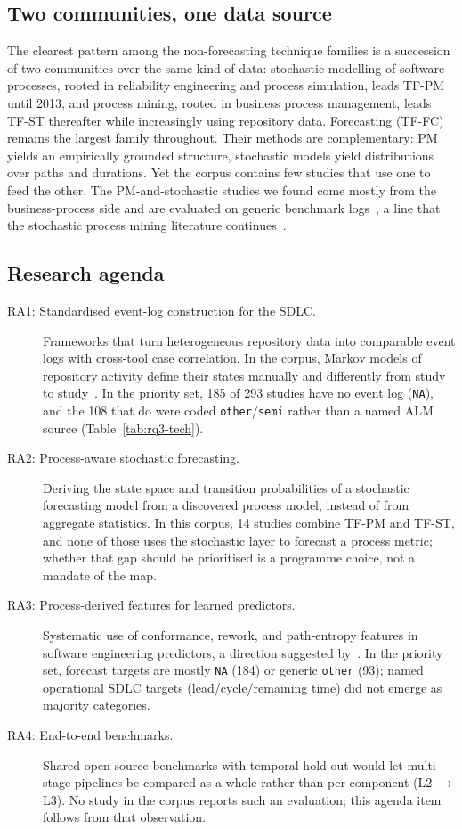\documentclass[preprint,12pt,authoryear=false]{elsarticle}
\newcommand{\PM}{TF-PM}
\newcommand{\ST}{TF-ST}
\newcommand{\FC}{TF-FC}
\begin{document}
\subsection{Two communities, one data source}

The clearest pattern among the non-forecasting technique families is a succession of two communities over the same kind of data: stochastic modelling of software processes, rooted in reliability engineering and process simulation, leads \PM{} until 2013, and process mining, rooted in business process management, leads \ST{} thereafter while increasingly using repository data. Forecasting (\FC{}) remains the largest family throughout. Their methods are complementary: PM yields an empirically grounded structure, stochastic models yield distributions over paths and durations. Yet the corpus contains few studies that use one to feed the other. The PM-and-stochastic studies we found come mostly from the business-process side and are evaluated on generic benchmark logs~\cite{incerto2025,lopezpintado2023}, a line that the stochastic process mining literature continues~\cite{burke2020}.

\subsection{Research agenda}\label{sec:agenda}

\begin{description}
\item[RA1: Standardised event-log construction for the SDLC.] Frameworks that turn heterogeneous repository data into comparable event logs with cross-tool case correlation. In the corpus, Markov models of repository activity define their states manually and differently from study to study~\cite{jo2023,jo2024,ortu2023}. In the priority set, 185 of 293 studies have no event log (\texttt{NA}), and the 108 that do were coded \texttt{other}/\texttt{semi} rather than a named ALM source (Table~\ref{tab:rq3-tech}).
\item[RA2: Process-aware stochastic forecasting.] Deriving the state space and transition probabilities of a stochastic forecasting model from a discovered process model, instead of from aggregate statistics. In this corpus, 14 studies combine \PM{} and \ST{}, and none of those uses the stochastic layer to forecast a process metric; whether that gap should be prioritised is a programme choice, not a mandate of the map.
\item[RA3: Process-derived features for learned predictors.] Systematic use of conformance, rework, and path-entropy features in software engineering predictors, a direction suggested by~\cite{caldeira2022,gupta2017}. In the priority set, forecast targets are mostly \texttt{NA} (184) or generic \texttt{other} (93); named operational SDLC targets (lead/cycle/remaining time) did not emerge as majority categories.
\item[RA4: End-to-end benchmarks.] Shared open-source benchmarks with temporal hold-out would let multi-stage pipelines be compared as a whole rather than per component (L2 $\rightarrow$ L3). No study in the corpus reports such an evaluation; this agenda item follows from that observation.
\end{description}
\end{document}
